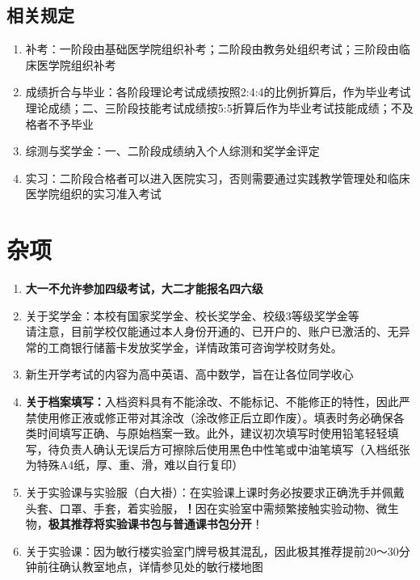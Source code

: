 \subsection[相关规定]{相关规定}
\label{other_rules_exam}
\begin{enumerate}
    \item 补考：一阶段由基础医学院组织补考；二阶段由教务处组织考试；三阶段由临床医学院组织补考
    \item 成绩折合与毕业：各阶段理论考试成绩按照2:4:4的比例折算后，作为毕业考试理论成绩；二、三阶段技能考试成绩按5:5折算后作为毕业考试技能成绩；不及格者不予毕业
    \item 综测与奖学金：一、二阶段成绩纳入个人综测和奖学金评定
    \item 实习：二阶段合格者可以进入医院实习，否则需要通过实践教学管理处和临床医学院组织的实习准入考试
\end{enumerate}

\section[杂项]{杂项}
\begin{enumerate}
    \item \textbf{大一不允许参加四级考试，大二才能报名四六级}
    \item 关于奖学金：本校有国家奖学金、校长奖学金、校级3等级奖学金等\\
          请注意，目前学校仅能通过本人身份开通的、已开户的、账户已激活的、无异常的工商银行储蓄卡发放奖学金，详情政策可咨询学校财务处。
    \item 新生开学考试\footnotemark 的内容为高中英语、高中数学，旨在让各位同学收心
    \item \textbf{关于档案填写：}入档资料具有不能涂改、不能标记、不能修正的特性，因此严禁使用修正液或修正带对其涂改（涂改修正后立即作废）。填表时务必确保各类时间填写正确、与原始档案一致。此外，建议初次填写时使用铅笔轻轻填写，待负责人确认无误后方可擦除后使用黑色中性笔或中油笔填写（入档纸张为特殊A4纸，厚、重、滑，难以自行复印）
    \item 关于实验课与实验服（白大褂）：在实验课上课时务必按要求正确洗手并佩戴头套、口罩、手套，着实验服，\textbf{！}因在实验室中需频繁接触实验动物、微生物，\textbf{极其推荐将实验课书包与普通课书包分开}！\label{schoolbag}
    \item 关于实验课：因为敏行楼实验室门牌号极其混乱，因此极其推荐提前20～30分钟前往确认教室地点，详情参见处的敏行楼地图
\end{enumerate}
